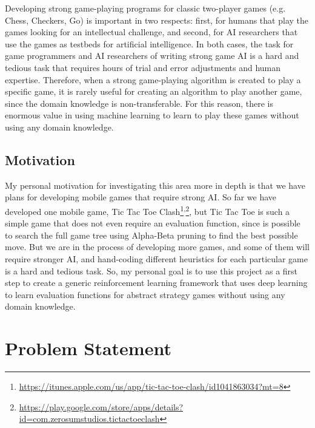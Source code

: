 \documentclass{article}
\begin{document}
Developing strong game-playing programs for classic two-player games (e.g. Chess, Checkers, Go) is
important in two respects: first, for humans that play the games looking for an intellectual
challenge, and second, for AI researchers that use the games as testbeds for artificial
intelligence. In both cases, the task for game programmers and AI researchers of writing strong game
AI is a hard and tedious task that requires hours of trial and error adjustments and human
expertise. Therefore, when a strong game-playing algorithm is created to play a specific game, it is
rarely useful for creating an algorithm to play another game, since the domain knowledge is
non-transferable. For this reason, there is enormous value in using machine learning to learn to
play these games without using any domain knowledge.

\subsection{Motivation}

\newcommand{\URLticapp}{https://itunes.apple.com/us/app/tic-tac-toe-clash/id1041863034?mt=8}
\newcommand{\URLticplay}{https://play.google.com/store/apps/details?id=com.zerosumstudios.tictactoeclash}

My personal motivation for investigating this area more in depth is that we have plans for
developing mobile games that require strong AI. So far we have developed one mobile game, {Tic Tac
Toe Clash}\footnote{\url{\URLticapp}}\textsuperscript{,}\footnote{\url{\URLticplay}}, but Tic Tac
Toe is such a simple game that does not even require an evaluation function, since is possible to
search the full game tree using Alpha-Beta pruning to find the best possible move. But we are in the
process of developing more games, and some of them will require stronger AI, and hand-coding
different heuristics for each particular game is a hard and tedious task. So, my personal goal is to
use this project as a first step to create a generic reinforcement learning framework that uses deep
learning to learn evaluation functions for abstract strategy games without using any domain
knowledge.

\section{Problem Statement}
\label{sec:problem-statement}
\end{document}

